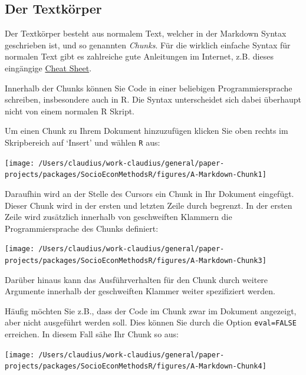 \documentclass[]{book}
\begin{document}
\subsection{Der Textkörper}\label{der-textkorper}

Der Textkörper besteht aus normalem Text, welcher in der Markdown Syntax
geschrieben ist, und so genannten \emph{Chunks}. Für die wirklich
einfache Syntax für normalen Text gibt es zahlreiche gute Anleitungen im
Internet, z.B. dieses eingängige
\href{https://rstudio.com/wp-content/uploads/2016/03/rmarkdown-cheatsheet-2.0.pdf}{Cheat
Sheet}.

Innerhalb der Chunks können Sie Code in einer beliebigen
Programmiersprache schreiben, insbesondere auch in R. Die Syntax
unterscheidet sich dabei überhaupt nicht von einem normalen R Skript.

Um einen Chunk zu Ihrem Dokument hinzuzufügen klicken Sie oben rechts im
Skripbereich auf `Insert' und wählen \texttt{R} aus:

\begin{center}\texttt{[image: /Users/claudius/work-claudius/general/paper-projects/packages/SocioEconMethodsR/figures/A-Markdown-Chunk1]} \end{center}

Daraufhin wird an der Stelle des Cursors ein Chunk in Ihr Dokument
eingefügt. Dieser Chunk wird in der ersten und letzten Zeile durch
\texttt{\textasciigrave{}\textasciigrave{}\textasciigrave{}} begrenzt.
In der ersten Zeile wird zusätzlich innerhalb von geschweiften Klammern
die Programmiersprache des Chunks definiert:

\begin{center}\texttt{[image: /Users/claudius/work-claudius/general/paper-projects/packages/SocioEconMethodsR/figures/A-Markdown-Chunk3]} \end{center}

Darüber hinaus kann das Ausführverhalten für den Chunk durch weitere
Argumente innerhalb der geschweiften Klammer weiter spezifiziert werden.

Häufig möchten Sie z.B., dass der Code im Chunk zwar im Dokument
angezeigt, aber nicht ausgeführt werden soll. Dies können Sie durch die
Option \texttt{eval=FALSE} erreichen. In diesem Fall sähe Ihr Chunk so
aus:

\begin{center}\texttt{[image: /Users/claudius/work-claudius/general/paper-projects/packages/SocioEconMethodsR/figures/A-Markdown-Chunk4]} \end{center}
\end{document}
